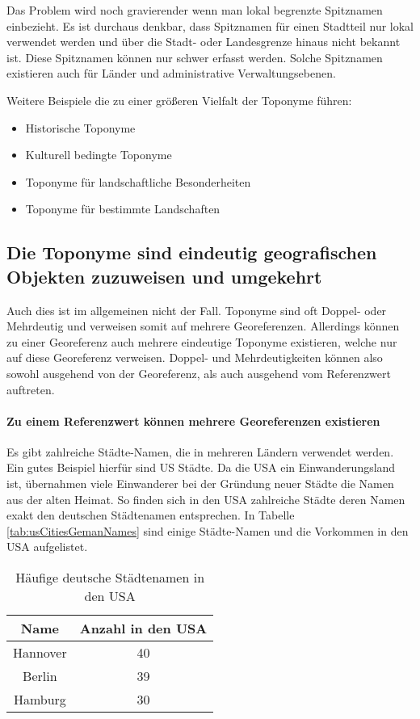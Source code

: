 					Das Problem wird noch gravierender wenn man lokal begrenzte Spitznamen einbezieht.
					Es ist durchaus denkbar, dass Spitznamen für einen Stadtteil nur lokal verwendet werden und über die Stadt- oder Landesgrenze hinaus nicht bekannt ist. 
					Diese Spitznamen können nur schwer erfasst werden.
					Solche Spitznamen existieren auch für Länder und administrative Verwaltungsebenen. 

					Weitere Beispiele die zu einer größeren Vielfalt der Toponyme führen:

					\begin{itemize}
						\item Historische Toponyme
						\item Kulturell bedingte Toponyme
						\item Toponyme für landschaftliche Besonderheiten
						\item Toponyme für bestimmte Landschaften
					\end{itemize}
		
		\subsection{Die Toponyme sind eindeutig geografischen Objekten zuzuweisen und umgekehrt} 

				Auch dies ist im allgemeinen nicht der Fall. 
				Toponyme sind oft Doppel- oder Mehrdeutig und verweisen somit auf mehrere Georeferenzen.
				Allerdings können zu einer Georeferenz auch mehrere eindeutige Toponyme existieren, welche nur auf diese Georeferenz verweisen.
				Doppel- und Mehrdeutigkeiten können also sowohl ausgehend von der Georeferenz, als auch ausgehend vom Referenzwert auftreten.

				\paragraph{Zu einem Referenzwert können mehrere Georeferenzen existieren}

					Es gibt zahlreiche Städte-Namen, die in mehreren Ländern verwendet werden.
					Ein gutes Beispiel hierfür sind US Städte. 
					Da die USA ein Einwanderungsland ist, übernahmen viele Einwanderer bei der Gründung neuer Städte die Namen aus der alten Heimat. 
					So finden sich in den USA zahlreiche Städte deren Namen exakt den deutschen Städtenamen entsprechen. 
					In Tabelle \ref{tab:usCitiesGemanNames} sind einige Städte-Namen und die Vorkommen in den USA aufgelistet.
					
					\begin{table}[htpb]
						\caption{Häufige deutsche Städtenamen in den USA} 
						\centering
						\begin{tabular}{|c|c|}
							\hline
							Name & Anzahl in den USA \\
							\hline\hline
							Hannover & 40 \\
							\hline
							Berlin & 39 \\
							\hline
							Hamburg & 30 \\
							\hline
						\end{tabular}
						\label{tab:usCitiesGermanNames} 
					\end{table}


